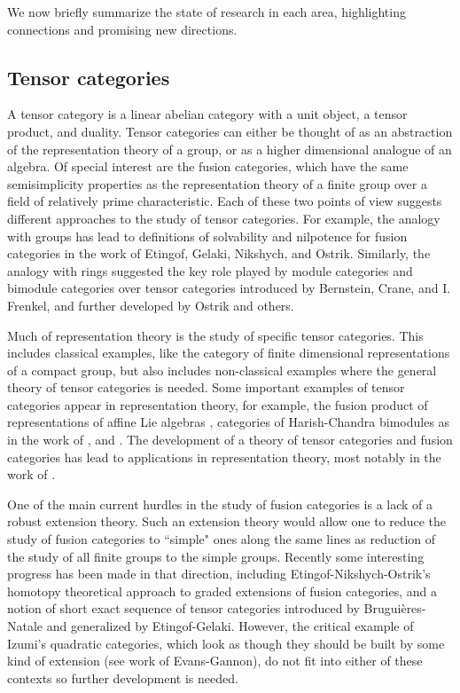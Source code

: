 \documentclass[12pt]{article}
\begin{document}
We now briefly summarize the state of research in each area, highlighting connections and promising new directions.

\subsection{Tensor categories}
A tensor category is a linear abelian category with a unit object, a tensor product, and duality. Tensor categories can either be thought of as an abstraction of the representation theory of a group, or as a higher dimensional analogue of an algebra. Of special interest are the fusion categories, which have the same semisimplicity properties as the representation theory of a finite group over a field of relatively prime characteristic.  Each of these two points of view suggests different approaches to the study of tensor categories. For example, the analogy with groups has lead to definitions of solvability and nilpotence for fusion categories in the work of Etingof, Gelaki, Nikshych, and Ostrik.  Similarly, the analogy with rings suggested the key role played by module categories and bimodule categories over tensor categories introduced by Bernstein, Crane, and I. Frenkel, and further developed by Ostrik and others.

Much of representation theory is the study of specific tensor categories. This includes classical examples, like the category of finite dimensional representations of a compact group, but also includes non-classical examples where the general theory of tensor categories is needed.  Some important examples of tensor categories appear in representation theory, for example, the fusion product of representations of affine Lie algebras , categories of Harish-Chandra bimodules as in the work of , and . The development of a theory of tensor categories and fusion categories has lead to applications in representation theory, most notably in the work of .

One of the main current hurdles in the study of fusion categories is a lack of a robust extension theory. Such an extension theory would allow one to reduce the study of fusion categories to ``simple" ones along the same lines as reduction of the study of all finite groups to the simple groups. Recently some interesting progress has been made in that direction, including Etingof-Nikshych-Ostrik's homotopy theoretical approach to graded extensions of fusion categories, and a notion of short exact sequence of tensor categories introduced by Brugui\`eres-Natale and generalized by Etingof-Gelaki. However, the critical example of Izumi's quadratic categories, which look as though they should be built by some kind of extension (see work of Evans-Gannon), do not fit into either of these contexts so further development is needed.
\end{document}

